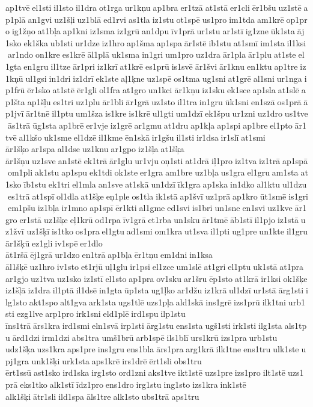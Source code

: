 ap1tvē el1sti il1sto il1dra ot1rga ur1kņu ap1bra er1tzā at1stā er1cli ēr1bšu uz1stē ap1plā an1gvi uz1šļi uz1blā ed1rvi as1tla iz1stu ot1spē us1pro im1tda am1krē op1pro ig1žņo at1bļa ap1kni iz1sma iz1grū an1dpu īv1prā ur1stu ar1stī ig1zne ūk1sta āj1sko ek1ška ub1sti ur1dze iz1hro ap1šma ap1spa ār1stē ib1stu at1smī im1sta il1ksi ar1ndo on1kre es1krē āl1plā uk1sma in1gri um1pro uz1dra ār1pla ār1plu at1ste el1gta en1gru il1tze ār1pri iz1krī at1krē es1prū is1svē ār1švi ār1knu en1ktu ap1tre iz1kņū ul1gsi in1dri iz1drī ek1ste aļ1ķne uz1spē os1tma ug1sni at1grē al1sni ur1nga ip1frū ēr1sko at1stē ēr1gli ol1fra at1gro un1kci ār1kņu iz1sku ek1sce ap1sla at1slē ap1šta ap1šļu es1tri uz1plu ār1bli ār1grā uz1sto il1tra in1gru ūk1sni en1szā os1prā āp1jvī ār1tnē il1ptu um1šza is1kre is1krē ul1gti um1dzī ek1špu ur1zni uz1dro us1tve ās1trā ūg1sta ap1brē er1vje iz1grē ar1gmu at1dru ap1kļa ap1spi ap1bre el1pto ār1tvē al1kšo uk1sme el1dzē il1kme ēn1skā ir1gšu il1sti ir1dsa ir1slī at1smi 	ār1šķo ar1spa al1dse uz1knu ar1gpo iz1šļa at1šķa 	ār1šņu uz1sve an1stē ek1trā ār1glu ur1vju oņ1sti at1drā iļ1pro iz1tva iz1trā ap1spā om1pli ak1stu ap1spu ek1tdi ok1ste er1gra am1bre uz1bļa us1gra el1gru am1sta at1sko īb1stu ek1tri el1mla an1sve at1skā un1dzī īk1gra ap1ska in1dko al1ktu ul1dzu es1trā at1spī ol1dla at1šķe eņ1ple os1tla ik1stā ap1švī uz1prā ap1kro ūt1smē is1gri em1pšu iz1bļa ir1mno ap1spī ēr1kti al1gme ed1svi is1bri un1sne en1svi uz1kve ār1gro er1stā uz1šķe eļ1krū od1rpa īv1grā et1rba un1sku ār1tmē āb1stī il1pjo iz1stā uz1žvī 	uz1šķī is1tko os1pra el1gtu ad1smi om1kra ut1sva il1pti ug1pre un1kte il1gru 
ār1šķū ez1gli iv1spē er1dlo 	āt1ršā ēj1grā ur1dzo en1trā ap1bļa ēr1tņu em1dni in1ksa 
āl1šķē uz1hro iv1sto et1rjū uļ1glu ir1psi el1zce um1slē at1gri el1ptu uk1stā at1pra ar1gjo uz1tva uz1sko iz1stī el1sto ap1pra ov1sku ar1šru ēp1sto at1krā ir1ksi ok1šķe 	iz1šļā iz1dra il1ptā il1dsē in1gta ūp1sta ug1ļko ar1džu iz1krā ul1dzī ur1stā ārg1sti ilg1sto akt1spo alt1gva ark1sta ugs1tlē uzs1pļa ald1skā ins1grē izs1prū ilk1tni urb1sti ezg1lve arp1pro irk1sni eld1plē ird1spu ilp1stu 	īns1trā ārs1kra ird1smi eln1svā irp1sti ārg1stu ens1sta ugš1sti irk1sti ilg1sta als1tpu ārd1dzi irm1dzi abs1tra 	umš1brū arb1spē ils1blī urs1krū izs1pra urb1stu 	udz1šķa uzs1kra aps1pre ins1gru ens1bla ārs1pra arg1krā ilk1tne ens1tru ulk1ste upj1gra 	unk1šķi urk1sta aps1krē irs1drē ērt1sli obs1tru 	ērt1ssū ast1sko ird1ska irg1sto ord1zni aks1tve ikt1stē uzs1pre izs1pro ilt1stē uzs1prā eks1tko alk1stī īdz1pro ens1dro irg1stu ing1sto izs1kra ink1stē 	alk1šķi ātr1sli ild1spa āls1tre alk1sto ubs1trā aps1tru 

